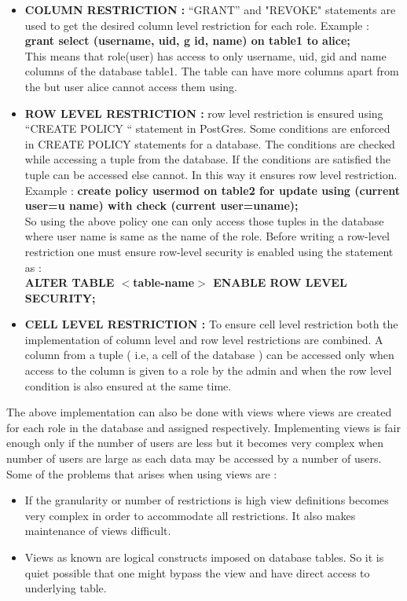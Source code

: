 \documentclass[11pt,a4paper]{report}
\begin{document}
\begin{itemize}
    \item \textbf{COLUMN RESTRICTION :}  “GRANT” and "REVOKE" statements are used to get the desired column level restriction for each role. Example :\\ \textbf{grant select (user\textunderscore name, u\textunderscore id, g \textunderscore id, name) on table1 to alice;}\\
    This means that role(user) has access to only user\textunderscore name, u\textunderscore id, g\textunderscore id and 
    name columns of the database table1. The table can have more columns apart from the but user alice cannot access them using.
    \item \textbf{ROW LEVEL RESTRICTION :} row level restriction is ensured using “CREATE POLICY “ statement in PostGres. Some conditions are enforced in CREATE POLICY statements for a database. The conditions are checked while accessing a tuple from the database. If the conditions are satisfied the tuple can be accessed else cannot. In this way it ensures row level restriction. \\Example : \textbf{create policy usermod on table2 for update using (current \textunderscore user=u \textunderscore name) with check (current \textunderscore user=u\textunderscore name);}\\ So using the above policy one can only access those tuples in the database where user name is same as the name of the role. Before writing a row-level restriction one must ensure row-level security is enabled using the statement as :\\ 
    \textbf{ALTER TABLE $<$table-name$>$ ENABLE ROW LEVEL SECURITY;}

    \item \textbf{CELL LEVEL RESTRICTION :} To ensure cell level restriction both the implementation of column level and row level restrictions are combined. A column from a tuple ( i.e, a cell of the database ) can be accessed only when  access to the column is given to a role by the admin and when the row level condition is also ensured at the same time.
    
\end{itemize}

The above implementation can also be done with views where views are created for each role in the database and assigned respectively. Implementing views is fair enough only if the number of users are less but it becomes very complex when number of users are large as each data may be accessed by a number of users. Some of the problems that arises when using views are : 
\begin{itemize}
    \item If the granularity or number of restrictions is high view definitions becomes very complex in order to accommodate all restrictions. It also makes maintenance of views difficult.
    \item Views as known are logical constructs imposed on database tables. So it is quiet possible that one might bypass the view and have direct access to underlying table.
\end{itemize}
\end{document}
